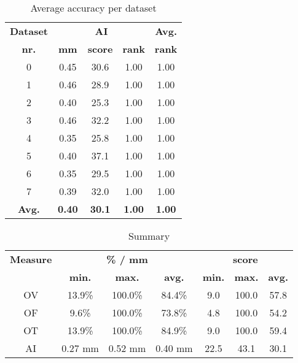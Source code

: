 \begin{table*}
\scriptsize
\caption{Average accuracy per dataset}
\centering
\begin{tabular}{|c|ccc|c|}
\hline
\multicolumn{1}{|c|}{\textbf{Dataset}} &\multicolumn{3}{c|}{\textbf{AI}} &\multicolumn{1}{c|}{\textbf{Avg.}} \\
\multicolumn{1}{|c|}{\textbf{nr.}} &\multicolumn{1}{c|}{\textbf{mm}} &\multicolumn{1}{c|}{\textbf{score}} &\multicolumn{1}{c|}{\textbf{rank}} &\multicolumn{1}{c|}{\textbf{rank}}\\
\hline
0&0.45&30.6& 1.00& 1.00\\
1&0.46&28.9& 1.00& 1.00\\
2&0.40&25.3& 1.00& 1.00\\
3&0.46&32.2& 1.00& 1.00\\
4&0.35&25.8& 1.00& 1.00\\
5&0.40&37.1& 1.00& 1.00\\
6&0.35&29.5& 1.00& 1.00\\
7&0.39&32.0& 1.00& 1.00\\
\hline
\textbf{Avg.}&\textbf{0.40}&\textbf{30.1}&\textbf{ 1.00}&\textbf{ 1.00}\\
\hline
\end{tabular}
\vspace{-0.3cm}
\label{tb:tb_4_5}
\normalsize
\end{table*}

\begin{table*}
\scriptsize
\caption{Summary}
\centering
\begin{tabular}{|c|ccc|ccc|}
\hline
\multicolumn{1}{|c|}{\textbf{Measure}} &\multicolumn{3}{c|}{\textbf{\% / mm}} &\multicolumn{3}{c|}{\textbf{score}} \\
\multicolumn{1}{|c|}{\textbf{}} &\multicolumn{1}{c|}{\textbf{min.}} &\multicolumn{1}{c|}{\textbf{max.}} &\multicolumn{1}{c|}{\textbf{avg.}} &\multicolumn{1}{c|}{\textbf{min.}} &\multicolumn{1}{c|}{\textbf{max.}} &\multicolumn{1}{c|}{\textbf{avg.}} \\
\hline
OV&13.9\%&100.0\%&84.4\%& 9.0&100.0&57.8\\
OF& 9.6\%&100.0\%&73.8\%& 4.8&100.0&54.2\\
OT&13.9\%&100.0\%&84.9\%& 9.0&100.0&59.4\\
AI&0.27 mm&0.52 mm&0.40 mm&22.5&43.1&30.1\\
\hline
\end{tabular}
\vspace{-0.3cm}
\label{tb:tb_4_6}
\normalsize
\end{table*}

